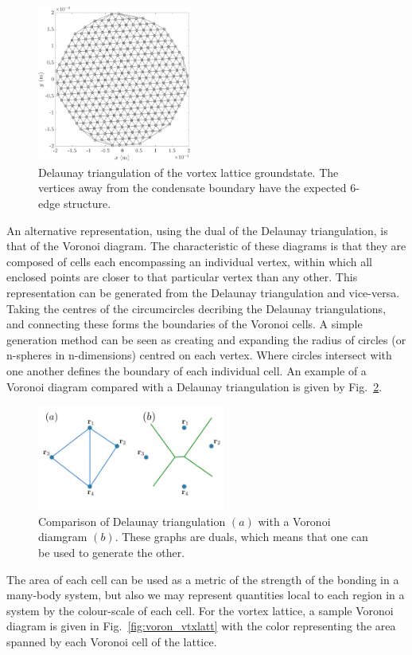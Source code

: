 \begin{figure}\centering
    \includegraphics[width=0.45\textwidth]{Images/ch4_vtx/Del_tr_VTXLATT}
    \caption{Delaunay triangulation of the vortex lattice groundstate. The vertices away from the condensate boundary have the expected 6-edge structure.}\label{fig:delaun_vtxlatt}
\end{figure}

An alternative representation, using the dual of the Delaunay triangulation, is that of the Voronoi diagram. The characteristic of these diagrams is that they are composed of cells each encompassing an individual vertex, within which all enclosed points are closer to that particular vertex than any other. This representation can be generated from the Delaunay triangulation and vice-versa. Taking the centres of the circumcircles decribing the Delaunay triangulations, and connecting these forms the boundaries of the Voronoi cells. A simple generation method can be seen as creating and expanding the radius of circles (or n-spheres in n-dimensions) centred on each vertex. Where circles intersect with one another defines the boundary of each individual cell. An example of a Voronoi diagram compared with a Delaunay triangulation is given by Fig.~\ref{fig:Voronoi}.
\begin{figure}\centering
    \includegraphics[width=0.55\textwidth]{Images/ch6_phasegineer/imgs/Voronoi}
    \caption{Comparison of Delaunay triangulation $(a)$ with a Voronoi diamgram $(b)$. These graphs are duals, which means that one can be used to generate the other.}\label{fig:Voronoi}
\end{figure}
The area of each cell can be used as a metric of the strength of the bonding in a many-body system, but also we may represent quantities local to each region in a system by the colour-scale of each cell. For the vortex lattice, a sample Voronoi diagram is given in Fig.~\ref{fig:voron_vtxlatt} with the color representing the area spanned by each Voronoi cell of the lattice.

